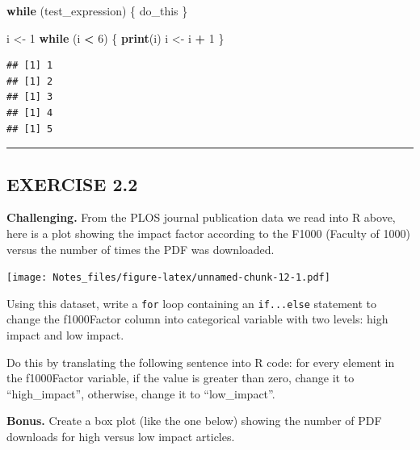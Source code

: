 \documentclass[
]{book}
\newenvironment{Shaded}{\begin{snugshade}}{\end{snugshade}}
\newcommand{\ControlFlowTok}[1]{\textcolor[rgb]{0.13,0.29,0.53}{\textbf{#1}}}
\newcommand{\DecValTok}[1]{\textcolor[rgb]{0.00,0.00,0.81}{#1}}
\newcommand{\KeywordTok}[1]{\textcolor[rgb]{0.13,0.29,0.53}{\textbf{#1}}}
\newcommand{\NormalTok}[1]{#1}
\newcommand{\OperatorTok}[1]{\textcolor[rgb]{0.81,0.36,0.00}{\textbf{#1}}}
\newcommand{\StringTok}[1]{\textcolor[rgb]{0.31,0.60,0.02}{#1}}
\begin{document}
\begin{Shaded}
\begin{Highlighting}[]
\ControlFlowTok{while}\NormalTok{ (test_expression) \{}
\NormalTok{  do_this}
\NormalTok{\}}
\end{Highlighting}
\end{Shaded}

\begin{Shaded}
\begin{Highlighting}[]
\NormalTok{i <-}\StringTok{ }\DecValTok{1}
\ControlFlowTok{while}\NormalTok{ (i }\OperatorTok{<}\StringTok{ }\DecValTok{6}\NormalTok{) \{}
  \KeywordTok{print}\NormalTok{(i)}
\NormalTok{  i <-}\StringTok{ }\NormalTok{i }\OperatorTok{+}\StringTok{ }\DecValTok{1}
\NormalTok{\}}
\end{Highlighting}
\end{Shaded}

\begin{verbatim}
## [1] 1
## [1] 2
## [1] 3
## [1] 4
## [1] 5
\end{verbatim}

\begin{center}\rule{0.5\linewidth}{0.5pt}\end{center}

\hypertarget{exercise-2.2}{%
\subsection*{EXERCISE 2.2}\label{exercise-2.2}}

\textbf{Challenging.} From the PLOS journal publication data we read into R above, here is a plot showing the impact factor according to the F1000 (Faculty of 1000) versus the number of times the PDF was downloaded.

\texttt{[image: Notes\_files/figure-latex/unnamed-chunk-12-1.pdf]}

Using this dataset, write a \texttt{for} loop containing an \texttt{if...else} statement to change the f1000Factor column into categorical variable with two levels: high impact and low impact.

Do this by translating the following sentence into R code: for every element in the f1000Factor variable, if the value is greater than zero, change it to ``high\_impact'', otherwise, change it to ``low\_impact''.

\textbf{Bonus.} Create a box plot (like the one below) showing the number of PDF downloads for high versus low impact articles.
\end{document}

